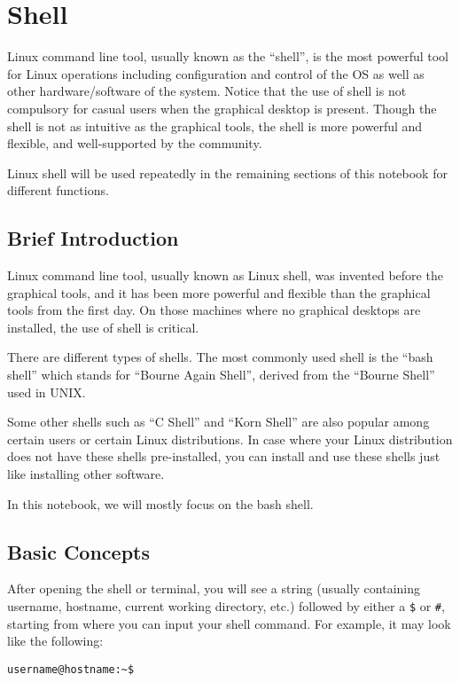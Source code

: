 \chapter{Shell}

Linux command line tool, usually known as the ``shell'', is the most powerful tool for Linux operations including configuration and control of the OS as well as other hardware/software of the system. Notice that the use of shell is not compulsory for casual users when the graphical desktop is present. Though the shell is not as intuitive as the graphical tools, the shell is more powerful and flexible, and well-supported by the community.

Linux shell will be used repeatedly in the remaining sections of this notebook for different functions.

\section{Brief Introduction}

Linux command line tool, usually known as Linux shell, was invented before the graphical tools, and it has been more powerful and flexible than the graphical tools from the first day. On those machines where no graphical desktops are installed, the use of shell is critical.

There are different types of shells. The most commonly used shell is the ``bash shell'' which stands for ``Bourne Again Shell'', derived from the ``Bourne Shell'' used in UNIX.

Some other shells such as ``C Shell'' and ``Korn Shell'' are also popular among certain users or certain Linux distributions. In case where your Linux distribution does not have these shells pre-installed, you can install and use these shells just like installing other software.

In this notebook, we will mostly focus on the bash shell.

\section{Basic Concepts}

After opening the shell or terminal, you will see a string (usually containing username, hostname, current working directory, etc.) followed by either a \verb|$| or \verb|#|, starting from where you can input your shell command. For example, it may look like the following:
\begin{verbatim}
username@hostname:~$
\end{verbatim}

